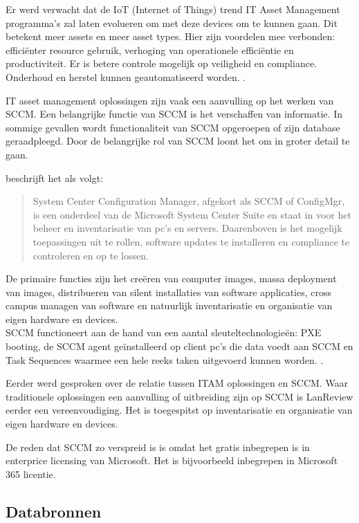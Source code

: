 Er werd verwacht dat de IoT (Internet of Things) trend IT Asset Management programma's zal laten evolueren om met deze devices om te kunnen gaan. Dit betekent meer assets en meer asset types. Hier zijn voordelen mee verbonden: efficiënter resource gebruik, verhoging van operationele efficiëntie en productiviteit. Er is betere controle mogelijk op veiligheid en compliance. Onderhoud en herstel kunnen geautomatiseerd worden. \autocite{Badnakhe2020}.

IT asset management oplossingen zijn vaak een aanvulling op het werken van SCCM. Een belangrijke functie van SCCM is het verschaffen van informatie. In sommige gevallen wordt functionaliteit van SCCM opgeroepen of zijn database geraadpleegd. Door de belangrijke rol van SCCM loont het om in groter detail te gaan.

\textcite{Droogenbroot2016} beschrijft het als volgt:
\begin{quote}
    System Center Configuration Manager, afgekort als SCCM of ConfigMgr, is een onderdeel van de Microsoft System Center Suite en staat in voor het beheer en inventarisatie van pc's en servers. Daarenboven is het mogelijk toepassingen uit te rollen, software updates te installeren en compliance te controleren en op te lossen.
\end{quote}

De primaire functies zijn het creëren van computer images, massa deployment van images, distribueren van silent installaties van software applicaties, cross campus managen van software en natuurlijk inventarisatie en organisatie van eigen hardware en devices.\\
SCCM functioneert aan de hand van een aantal sleuteltechnologieën: PXE booting, de SCCM agent geïnstalleerd op client pc's die data voedt aan SCCM en Task Sequences waarmee een hele reeks taken uitgevoerd kunnen worden. \autocite{Spitze2019}.

Eerder werd gesproken over de relatie tussen ITAM oplossingen en SCCM. Waar traditionele oplossingen een aanvulling of uitbreiding zijn op SCCM is LanReview eerder een vereenvoudiging. Het is toegespitst op inventarisatie en organisatie van eigen hardware en devices.

De reden dat SCCM zo verspreid is is omdat het gratis inbegrepen is in enterprice licensing van Microsoft. Het is bijvoorbeeld inbegrepen in Microsoft 365 licentie. \autocite{MicrosoftDocs2020}

\subsection{Databronnen}

